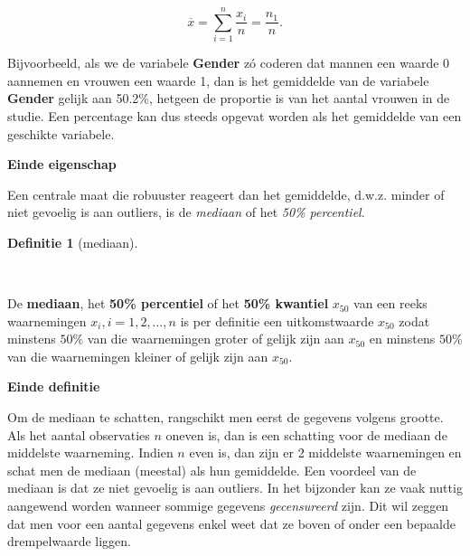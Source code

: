 \documentclass[
  dutch,
  letterpaper,
  12pt]{book}
\newenvironment{Shaded}{\begin{snugshade}}{\end{snugshade}}
\newcommand{\AttributeTok}[1]{\textcolor[rgb]{0.40,0.45,0.13}{#1}}
\newcommand{\ConstantTok}[1]{\textcolor[rgb]{0.56,0.35,0.01}{#1}}
\newcommand{\FunctionTok}[1]{\textcolor[rgb]{0.28,0.35,0.67}{#1}}
\newcommand{\NormalTok}[1]{\textcolor[rgb]{0.00,0.23,0.31}{#1}}
\newcommand{\SpecialCharTok}[1]{\textcolor[rgb]{0.37,0.37,0.37}{#1}}
\theoremstyle{definition}
\theoremstyle{definition}
\newtheorem{definition}{Definitie}[chapter]
\theoremstyle{definition}
\theoremstyle{remark}
\begin{document}
\begin{equation*}
\overline{x}= \sum_{i=1}^n \frac{x_i}{n} = \frac{n_1}{n}.
\end{equation*}

Bijvoorbeeld, als we de variabele \textbf{Gender} zó coderen dat mannen
een waarde 0 aannemen en vrouwen een waarde 1, dan is het gemiddelde van
de variabele \textbf{Gender} gelijk aan 50.2\%, hetgeen de proportie is
van het aantal vrouwen in de studie. Een percentage kan dus steeds
opgevat worden als het gemiddelde van een geschikte variabele.

\textbf{Einde eigenschap}

Een centrale maat die robuuster reageert dan het gemiddelde, d.w.z.
minder of niet gevoelig is aan outliers, is de \emph{mediaan} of het
\emph{50\% percentiel}.

\begin{definition}[mediaan]\protect\hypertarget{def-mediaan}{}\label{def-mediaan}

~

\end{definition}

De \textbf{mediaan}, het \textbf{50\% percentiel} of het \textbf{50\%
kwantiel} \(x_{50}\) van een reeks waarnemingen
\(x_i, i=1, 2, \dots, n\) is per definitie een uitkomstwaarde \(x_{50}\)
zodat minstens \(50\%\) van die waarnemingen groter of gelijk zijn aan
\(x_{50}\) en minstens \(50\%\) van die waarnemingen kleiner of gelijk
zijn aan \(x_{50}\).

\textbf{Einde definitie}

Om de mediaan te schatten, rangschikt men eerst de gegevens volgens
grootte. Als het aantal observaties \(n\) oneven is, dan is een
schatting voor de mediaan de middelste waarneming. Indien \(n\) even is,
dan zijn er 2 middelste waarnemingen en schat men de mediaan (meestal)
als hun gemiddelde. Een voordeel van de mediaan is dat ze niet gevoelig
is aan outliers. In het bijzonder kan ze vaak nuttig aangewend worden
wanneer sommige gegevens \emph{gecensureerd} zijn. Dit wil zeggen dat
men voor een aantal gegevens enkel weet dat ze boven of onder een
bepaalde drempelwaarde liggen.

\begin{Shaded}
\end{Shaded}
\end{document}
